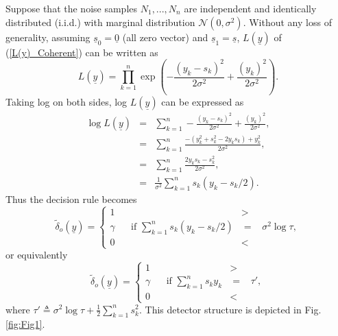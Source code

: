 \documentclass[a4paper,english,12pt]{article}
\begin{document}
\begin{exmp}
\label{caseI}
Suppose that the noise samples $N_{1},...,N_{n}$ are independent and identically distributed (i.i.d.) with marginal distribution $\mathcal{N}(0,\sigma^2)$. Without any loss of generality, assuming $\underline{s}_{0}= \underline{0}$ (all zero vector) and $\underline{s}_{1}= \underline{s}$, $L(\underline{y})$ of (\ref{L(y)_Coherent}) can be written as
\begin{equation}
L(\underline{y})=\prod_{k=1}^{n}\exp\left(-\frac{(y_{k}-s_{k})^2}{2\sigma^2}+\frac{(y_{k})^2}{2\sigma^2}\right).
\end{equation}
Taking log on both sides, log $L(\underline{y})$ can be expressed as
\begin{eqnarray}
\log L(\underline{y})
  &=& \sum_{k=1}^{n}-\frac{(y_{k}-s_{k})^2}{2\sigma^2}+\frac{(y_{k})^2}{2\sigma^2}, \nonumber\\
  &=& \sum_{k=1}^{n}\frac{-(y_{k}^2+s_{k}^2-2y_{k}s_{k})+y_{k}^2}{2\sigma^2}, \nonumber\\
  &=& \sum_{k=1}^{n}\frac{2 y_{k} s_{k}-s_{k}^2 }{2\sigma^2}, \nonumber\\
  &=& \frac {1}{\sigma^2}\sum_{k=1}^{n}s_{k}(y_{k}-s_{k}/2). 
\end{eqnarray}
Thus the decision rule becomes
\begin{equation}
{\tilde\delta_{o}(\underline{y})}= \begin{cases} 
1 &>\\
\gamma \hspace{20pt}\text{if }\sum_{k=1}^{n}s_{k}(y_{k}-s_{k}/2)&=\hspace{10pt}\sigma^2\log\tau,\\
0 &<
\end{cases}
\end{equation}
or equivalently
\begin{equation}
{\tilde\delta_{o}(\underline{y})}= \begin{cases} 
1 &>\\
\gamma \hspace{20pt}\text{if }\sum_{k=1}^{n}s_{k}y_{k}&=\hspace{10pt}\tau',\\
0 &<
\end{cases}
\end{equation}
where $\tau'\triangleq\sigma^2\log\tau+\frac{1}{2}\sum_{k=1}^{n}s_{k}^2$. This detector structure is depicted in Fig. \ref{fig:Fig1}.
\begin{figure}[h]

\end{figure}
\end{exmp}
\end{document}
